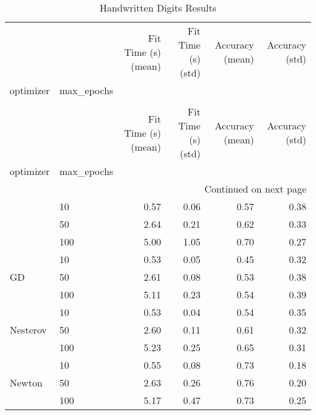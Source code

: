 \begin{longtable}{llrrrr}
\caption{Handwritten Digits Results} \label{tab:handwritten_digits_results} \\
\toprule
 &  & Fit Time (s) (mean) & Fit Time (s) (std) & Accuracy (mean) & Accuracy (std) \\
optimizer & max_epochs &  &  &  &  \\
\midrule
\endfirsthead
\caption[]{Handwritten Digits Results} \\
\toprule
 &  & Fit Time (s) (mean) & Fit Time (s) (std) & Accuracy (mean) & Accuracy (std) \\
optimizer & max_epochs &  &  &  &  \\
\midrule
\endhead
\midrule
\multicolumn{6}{r}{Continued on next page} \\
\midrule
\endfoot
\bottomrule
\endlastfoot
\multirow[t]{3}{*}{Adam} & 10 & 0.57 & 0.06 & 0.57 & 0.38 \\
 & 50 & 2.64 & 0.21 & 0.62 & 0.33 \\
 & 100 & 5.00 & 1.05 & 0.70 & 0.27 \\
\cline{1-6}
\multirow[t]{3}{*}{GD} & 10 & 0.53 & 0.05 & 0.45 & 0.32 \\
 & 50 & 2.61 & 0.08 & 0.53 & 0.38 \\
 & 100 & 5.11 & 0.23 & 0.54 & 0.39 \\
\cline{1-6}
\multirow[t]{3}{*}{Nesterov} & 10 & 0.53 & 0.04 & 0.54 & 0.35 \\
 & 50 & 2.60 & 0.11 & 0.61 & 0.32 \\
 & 100 & 5.23 & 0.25 & 0.65 & 0.31 \\
\cline{1-6}
\multirow[t]{3}{*}{Newton} & 10 & 0.55 & 0.08 & 0.73 & 0.18 \\
 & 50 & 2.63 & 0.26 & 0.76 & 0.20 \\
 & 100 & 5.17 & 0.47 & 0.73 & 0.25 \\
\cline{1-6}
\end{longtable}
